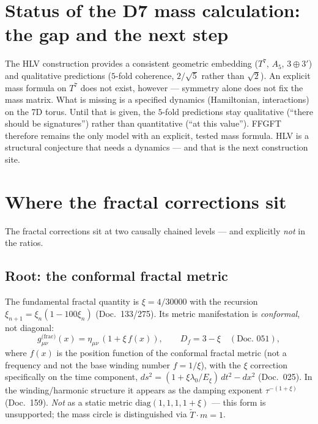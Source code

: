 \section{Status of the D7 mass calculation: the gap and the next step}
The HLV construction provides a consistent geometric embedding ($T^7$, $A_5$, $3\oplus3'$) and
qualitative predictions ($5$-fold coherence, $2/\sqrt5$ rather than $\sqrt2$). An explicit mass
formula on $T^7$ does not exist, however --- symmetry alone does not fix the mass matrix. What
is missing is a specified dynamics (Hamiltonian, interactions) on the 7D torus. Until that is
given, the $5$-fold predictions stay qualitative (\enquote{there should be signatures}) rather
than quantitative (\enquote{at this value}). FFGFT therefore remains the only model with an
explicit, tested mass formula. HLV is a structural conjecture that needs a dynamics --- and that
is the next construction site.

\section{Where the fractal corrections sit}
The fractal corrections sit at two causally chained levels --- and explicitly \emph{not} in the
ratios.

\subsection{Root: the conformal fractal metric}
The fundamental fractal quantity is $\xi=4/30000$ with the recursion
$\xi_{n+1}=\xi_n(1-100\xi_n)$ (Doc.~133/275). Its metric manifestation is \emph{conformal}, not
diagonal:
\[
g_{\mu\nu}^{\text{(frac)}}(x)=\eta_{\mu\nu}\,(1+\xi\,f(x)),\qquad D_f=3-\xi\quad(\text{Doc.~051}),
\]
where $f(x)$ is the position function of the conformal fractal metric (not a frequency and not the
base winding number $f = 1/\xi$), with the $\xi$ correction specifically on the time component, $ds^2=(1+\xi\lambda_0/E_\xi)\,dt^2-dx^2$
(Doc.~025). In the winding/harmonic structure it appears as the damping exponent $\tau^{-(1+\xi)}$
(Doc.~159). \emph{Not} as a static metric $\mathrm{diag}(1,1,1,1+\xi)$ --- this form is unsupported;
the mass circle is distinguished via $\tilde{T}\cdot m=1$.

